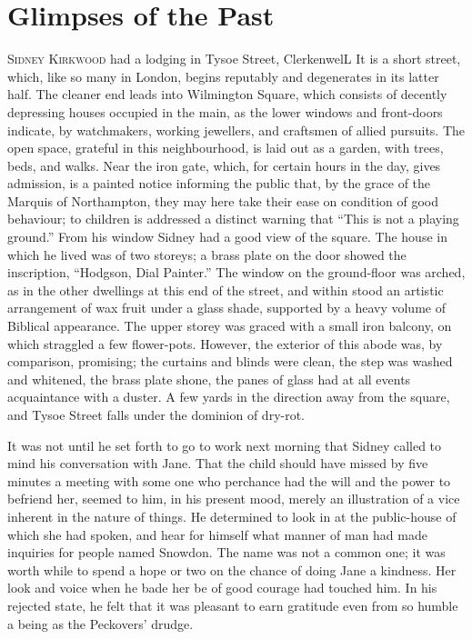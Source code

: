 \chapter{Glimpses of the Past}

\textsc{Sidney Kirkwood} had a lodging in Tysoe Street, ClerkenwelL It
is a short street, which, like so many in London, begins reputably and
degenerates in its latter half. The cleaner end leads into Wilmington
Square, which consists of decently depressing houses occupied in the
main, as the lower windows and front-doors indicate, by watchmakers,
working jewellers, and craftsmen of allied pursuits. The open space,
grateful in this neighbourhood, is laid out as a garden, with trees,
beds, and walks. Near the iron gate, which, for certain hours in the
day, gives admission, is a painted notice informing the public that, by
the grace of the Marquis of Northampton, they may here take their ease
on condition of good behaviour; to children
{\protect\hypertarget{120}{}{}}is addressed a distinct warning that
``This is not a playing ground.'' From his window Sidney had a good view
of the square. The house in which he lived was of two storeys; a brass
plate on the door showed the inscription, ``Hodgson, Dial Painter.'' The
window on the ground-floor was arched, as in the other dwellings at this
end of the street, and within stood an artistic arrangement of wax fruit
under a glass shade, supported by a heavy volume of Biblical appearance.
The upper storey was graced with a small iron balcony, on which
straggled a few flower-pots. However, the exterior of this abode was, by
comparison, promising; the curtains and blinds were clean, the step was
washed and whitened, the brass plate shone, the panes of glass had at
all events acquaintance with a duster. A few yards in the direction away
from the square, and Tysoe Street falls under the dominion of dry-rot.

It was not until he set forth to go to work next morning that Sidney
called to mind his conversation with Jane. That the child should
{\protect\hypertarget{121}{}{}}have missed by five minutes a meeting
with some one who perchance had the will and the power to befriend her,
seemed to him, in his present mood, merely an illustration of a vice
inherent in the nature of things. He determined to look in at the
public-house of which she had spoken, and hear for himself what manner
of man had made inquiries for people named Snowdon. The name was not a
common one; it was worth while to spend a hope or two on the chance of
doing Jane a kindness. Her look and voice when he bade her be of good
courage had touched him. In his rejected state, he felt that it was
pleasant to earn gratitude even from so humble a being as the Peckovers'
drudge.

